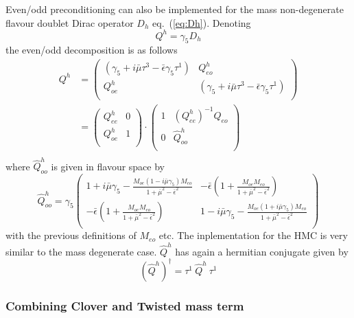 Even/odd preconditioning can also be implemented for the mass
non-degenerate flavour doublet Dirac operator $D_h$
eq.~(\ref{eq:Dh}). Denoting 
\[
Q^h = \gamma_5 D_h
\]
the even/odd decomposition is as follows
\begin{equation}
  \label{eq:Dheo}
  \begin{split}
    Q^h &=
    \begin{pmatrix}
      (\gamma_5+i\bar\mu\tau^3 -\bar\epsilon\gamma_5\tau^1) & Q^h_{eo}\\
      Q^h_{oe} & (\gamma_5+i\bar\mu\tau^3 -\bar\epsilon\gamma_5\tau^1)\\
    \end{pmatrix} \\
    &=
    \begin{pmatrix}
      Q^h_{ee} & 0 \\
      Q^h_{oe} & 1 \\
    \end{pmatrix}
    \cdot
    \begin{pmatrix}
      1 & (Q^h_{ee})^{-1}Q_{eo} \\
      0 & \hat Q^h_{oo} \\
    \end{pmatrix} \\
  \end{split}
\end{equation}
where $\hat Q^h_{oo}$ is given in flavour space by
\begin{equation*}
  \hat Q^h_{oo} = \gamma_5
  \begin{pmatrix}
    1 + i\bar\mu\gamma_5 -
    \frac{M_{oe}(1-i\bar\mu\gamma_5)M_{eo}}{1+\bar\mu^2-\bar\epsilon^2} & 
    -\bar\epsilon\left(1+\frac{M_{oe}M_{eo}}{1+\bar\mu^2-\bar\epsilon^2}\right) \\
    -\bar\epsilon\left(1+\frac{M_{oe}M_{eo}}{1+\bar\mu^2-\bar\epsilon^2}\right) & 
    1 - i\bar\mu\gamma_5 -
    \frac{M_{oe}(1+i\bar\mu\gamma_5)M_{eo}}{1+\bar\mu^2-\bar\epsilon^2}\\
  \end{pmatrix}
\end{equation*}
with the previous definitions of $M_{eo}$ etc. The inplementation for
the HMC is very similar to the mass degenerate case. $\hat Q^h$ has
again a hermitian conjugate given by
\[
(\hat Q^h)^\dagger = \tau^1\ \hat Q^h\ \tau^1
\]

\subsubsection{Combining Clover and Twisted mass term} \label{sec:clover_twist}

